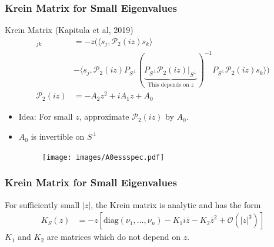 \documentclass[16pt]{beamer}
\newcommand{\calP}{\mathcal{P}}
\begin{document}
\begin{frame}
\frametitle{Krein Matrix for Small Eigenvalues}
	\begin{block}{Krein Matrix (Kapitula et al, 2019)}
	\begin{align*}
        [K_S(z)]_{jk} &= -z \Big( 
        \langle s_j , \calP_2(iz)s_k\rangle \\
        &- \langle s_j , \calP_2(iz) P_{S^{\perp}} (\underbrace{P_{S^{\perp}} \calP_2(iz)|_{S^{\perp}} }_{\text{This depends on }z})^{-1} P_{S^{\perp}} \calP_2(iz) s_k \rangle \Big) \\
        \calP_2(iz) &= -A_2 z^2 + i A_1 z + A_0
    \end{align*}
    \end{block}

    \begin{itemize}
    \item<1-> Idea: For small $z$, approximate $\calP_2(iz)$ by $A_0$.
    \item<2-> $A_0$ is invertible on $S^\perp$
        \begin{figure}
		\begin{center}
		\texttt{[image: images/A0essspec.pdf]}
		\end{center}
		\end{figure}
	\end{itemize}
\end{frame}

\begin{frame}
\frametitle{Krein Matrix for Small Eigenvalues}
	\begin{lemma}[Kapitula et al., 2019]
	For sufficiently small $|z|$, the Krein matrix is analytic and has the form
	\begin{align*}
	K_S(z) &= -z\left[ \text{diag}(\nu_1, \dots, \nu_n) - K_1 i \overline{z} - K_2 \overline{z}^2 + \mathcal{O}(|z|^3)\right]
	\end{align*}
	$K_1$ and $K_2$ are matrices which do not depend on $z$.
	\end{lemma}
\end{frame}
\end{document}
